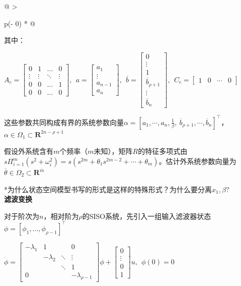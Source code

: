 \documentclass[
  12pt,
  a4paper
]{article}
\begin{document}
\begin{longtable}[]{@{}
  >{\raggedright\arraybackslash}p{}@{}}
其中：

\(A_{c} = \begin{bmatrix}
0 & 1 & \ldots & 0 \\
 \vdots & \vdots & \ddots & \vdots \\
0 & 0 & \ldots & 1 \\
0 & 0 & \ldots & 0
\end{bmatrix},\ \ a = \begin{bmatrix}
a_{1} \\
 \vdots \\
a_{n - 1} \\
a_{n}
\end{bmatrix},\ \ \overline{b} = \begin{bmatrix}
0 \\
 \vdots \\
1 \\
{\overline{b}}_{\rho + 1} \\
 \vdots \\
{\overline{b}}_{n}
\end{bmatrix},\ \ C_{c} = \begin{bmatrix}
1 & 0 & \cdots & 0
\end{bmatrix}\)

这些参数共同构成有界的系统参数向量\(\alpha = \left\lbrack a_{1},\cdots,a_{n},\frac{1}{\beta},\ {\overline{b}}_{\rho + 1},\cdots,{\overline{b}}_{n} \right\rbrack^{\top}\)，\(\alpha \in \Omega_{1} \subset \mathbf{R}^{2n - \rho + 1}\)

假设外系统含有\(m\)个频率（\(m\)未知），矩阵\(R\)的特征多项式由\(s\Pi_{i = 1}^{m}\left( s^{2} + \omega_{i}^{2} \right) = s\left( s^{2m} + \theta_{1}s^{2m - 2} + \cdots + \theta_{m} \right)\)。估计外系统参数向量为\(\overline{\theta} \in \Omega_{2} \subset \mathbf{R}^{\overline{m}}\)

*为什么状态空间模型书写的形式是这样的特殊形式？为什么要分离\(x_{1},\beta?\) \\
\textbf{滤波变换}

对于阶次为\(n\)，相对阶为\(\rho\)的SISO系统，先引入一组输入滤波器状态\(\phi = \left\lbrack \phi_{1},\ldots,\phi_{\rho - 1} \right\rbrack^{\top}\)

\(\dot{\phi} = \begin{bmatrix}
 - \lambda_{1} & 1 & & 0 \\
 & - \lambda_{2} & \ddots & \vdots \\
 & & \ddots & 1 \\
0 & & & - \lambda_{\rho - 1}
\end{bmatrix}\phi + \begin{bmatrix}
0 \\
 \vdots \\
0 \\
1
\end{bmatrix}u,\ \ \phi(0) = 0\)


\end{longtable}
\end{document}
